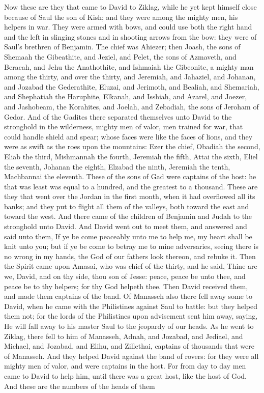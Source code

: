 Now these are they that came to David to Ziklag, while he yet kept himself close because of Saul the son of Kish; and they were among the mighty men, his helpers in war. They were armed with bows, and could use both the right hand and the left in slinging stones and in shooting arrows from the bow: they were of Saul’s brethren of Benjamin. The chief was Ahiezer; then Joash, the sons of Shemaah the Gibeathite, and Jeziel, and Pelet, the sons of Azmaveth, and Beracah, and Jehu the Anathothite, and Ishmaiah the Gibeonite, a mighty man among the thirty, and over the thirty, and Jeremiah, and Jahaziel, and Johanan, and Jozabad the Gederathite, Eluzai, and Jerimoth, and Bealiah, and Shemariah, and Shephatiah the Haruphite, Elkanah, and Isshiah, and Azarel, and Joezer, and Jashobeam, the Korahites, and Joelah, and Zebadiah, the sons of Jeroham of Gedor.  And of the Gadites there separated themselves unto David to the stronghold in the wilderness, mighty men of valor, men trained for war, that could handle shield and spear; whose faces were like the faces of lions, and they were as swift as the roes upon the mountains: Ezer the chief, Obadiah the second, Eliab the third, Mishmannah the fourth, Jeremiah the fifth, Attai the sixth, Eliel the seventh, Johanan the eighth, Elzabad the ninth, Jeremiah the tenth, Machbannai the eleventh. These of the sons of Gad were captains of the host: he that was least was equal to a hundred, and the greatest to a thousand. These are they that went over the Jordan in the first month, when it had overflowed all its banks; and they put to flight all them of the valleys, both toward the east and toward the west.  And there came of the children of Benjamin and Judah to the stronghold unto David. And David went out to meet them, and answered and said unto them, If ye be come peaceably unto me to help me, my heart shall be knit unto you; but if ye be come to betray me to mine adversaries, seeing there is no wrong in my hands, the God of our fathers look thereon, and rebuke it. Then the Spirit came upon Amasai, who was chief of the thirty, and he said, Thine are we, David, and on thy side, thou son of Jesse: peace, peace be unto thee, and peace be to thy helpers; for thy God helpeth thee. Then David received them, and made them captains of the band.  Of Manasseh also there fell away some to David, when he came with the Philistines against Saul to battle: but they helped them not; for the lords of the Philistines upon advisement sent him away, saying, He will fall away to his master Saul to the jeopardy of our heads. As he went to Ziklag, there fell to him of Manasseh, Adnah, and Jozabad, and Jediael, and Michael, and Jozabad, and Elihu, and Zillethai, captains of thousands that were of Manasseh. And they helped David against the band of rovers: for they were all mighty men of valor, and were captains in the host. For from day to day men came to David to help him, until there was a great host, like the host of God.  And these are the numbers of the heads of them 